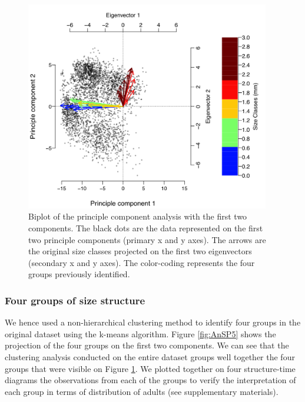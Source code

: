 \begin{figure}[!ht]
\begin{center}
\includegraphics[width=0.95\textwidth]{3-1_ChapExp1/Fig/AnnSP4}
\caption[Biplot of the principle component
analysis]{Biplot of the principle component analysis with the first two
components. The black dots are the data represented on the first two principle
components (primary x and y axes). The arrows are the original
size classes projected on the first two eigenvectors (secondary x and y axes).
The color-coding represents the four groups previously identified.}
\label{fig:AnSP4}
\end{center}
\end{figure}

\subsubsection{Four groups of size structure}

We hence used a non-hierarchical clustering method to identify four groups in
the original dataset using the k-means algorithm. Figure \ref{fig:AnSP5} shows the projection
of the four groups on the first two components. We can see that the clustering
analysis conducted on the entire dataset groups well together the four groups
that were visible on Figure \ref{fig:AnSP4}. We plotted together on four structure-time
diagrams the observations from each of the groups to verify the interpretation
of each group in terms of distribution of adults (see supplementary materials).

